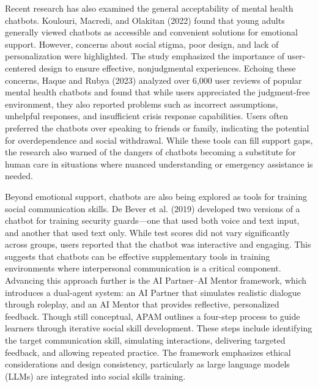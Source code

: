 Recent research has also examined the general acceptability of mental health chatbots. Koulouri, Macredi, and Olakitan (2022) found that young adults generally viewed chatbots as accessible and convenient solutions for emotional support. However, concerns about social stigma, poor design, and lack of personalization were highlighted. The study emphasized the importance of user-centered design to ensure effective, nonjudgmental experiences. Echoing these concerns, Haque and Rubya (2023) analyzed over 6,000 user reviews of popular mental health chatbots and found that while users appreciated the judgment-free environment, they also reported problems such as incorrect assumptions, unhelpful responses, and insufficient crisis response capabilities. Users often preferred the chatbots over speaking to friends or family, indicating the potential for overdependence and social withdrawal. While these tools can fill support gaps, the research also warned of the dangers of chatbots becoming a substitute for human care in situations where nuanced understanding or emergency assistance is needed.

Beyond emotional support, chatbots are also being explored as tools for training social communication skills. De Bever et al. (2019) developed two versions of a chatbot for training security guards—one that used both voice and text input, and another that used text only. While test scores did not vary significantly across groups, users reported that the chatbot was interactive and engaging. This suggests that chatbots can be effective supplementary tools in training environments where interpersonal communication is a critical component. Advancing this approach further is the AI Partner–AI Mentor framework, which introduces a dual-agent system: an AI Partner that simulates realistic dialogue through roleplay, and an AI Mentor that provides reflective, personalized feedback. Though still conceptual, APAM outlines a four-step process to guide learners through iterative social skill development. These steps include identifying the target communication skill, simulating interactions, delivering targeted feedback, and allowing repeated practice. The framework emphasizes ethical considerations and design consistency, particularly as large language models (LLMs) are integrated into social skills training.

